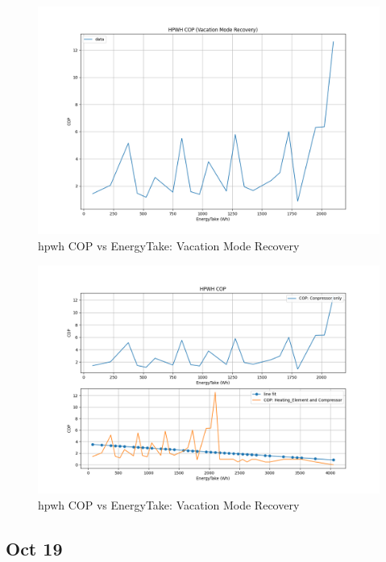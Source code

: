 \begin{figure}[htp!]
    \centering
    \includegraphics[width=0.9\columnwidth]{Pictures/cop_vs_EnergyTake_75.png}
    \caption{\gls{hpwh} COP vs EnergyTake: Vacation Mode Recovery}
    \label{fig:copET75}
\end{figure}
\newpage
\begin{figure}[ht!]
    \centering
    \includegraphics[width=\columnwidth]{Pictures/cop_vs_EnergyTake_75_linefit.png}
    \caption{\gls{hpwh} COP vs EnergyTake: Vacation Mode Recovery}
    \label{fig:copET75_linefit}
\end{figure}

\subsection{Oct 19}

